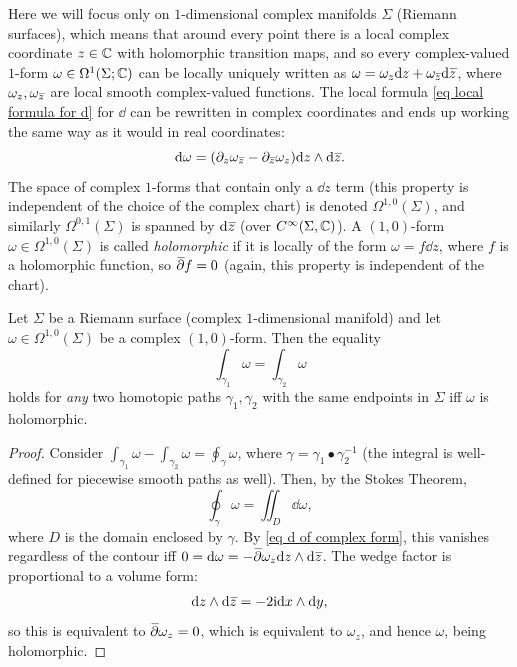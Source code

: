 \begin{rem}
    Here we will focus only on $1$-dimensional complex manifolds $\Sigma$ (Riemann surfaces), which means that around every point there is a local complex coordinate $z\in \mathbb{C}$ with holomorphic transition maps, and so every complex-valued $1$-form $\omega\in\Omega^1(\Sigma;\mathbb{C})$ can be locally uniquely written as $\omega=\omega_z \dd z+\omega_{\wb{z}} \dd \wb{z}$, where $\omega_z,\omega_{\wb{z}}$ are local smooth complex-valued functions.
    The local formula \eqref{eq local formula for d} for $\dd$ can be rewritten in complex coordinates and ends up working the same way as it would in real coordinates:
    \[\dd\omega=(\partial_{z} \omega_{\wb z}-\partial_{\wb z} \omega_{z})\dd z\wedge \dd \wb{z}.\label{eq d of complex form}\]
    The space of complex $1$-forms that contain only a $\dd z$ term (this property is independent of the choice of the complex chart) is denoted $\Omega^{1,0}(\Sigma)$, and similarly $\Omega^{0,1}(\Sigma)$ is spanned by $\dd \wb{z}$ (over $C^\infty(\Sigma,\mathbb{C})$). A $(1,0)$-form $\omega\in\Omega^{1,0}(\Sigma)$ is called \emph{holomorphic} if it is locally of the form $\omega=f\dd z$, where $f$ is a holomorphic function, so $\wb\partial f=0$ (again, this property is independent of the chart).
\end{rem}
\begin{cor}
    Let $\Sigma$ be a Riemann surface (complex $1$-dimensional manifold) and let $\omega\in\Omega^{1,0}(\Sigma)$ be a complex $(1,0)$-form. Then the equality
    \[\int_{\gamma_1}\omega=\int_{\gamma_2}\omega\]
    holds for \emph{any} two homotopic paths $\gamma_1,\gamma_2$ with the same endpoints in $\Sigma$ iff $\omega$ is holomorphic.
\end{cor}
\begin{proof}
    Consider $\int_{\gamma_1}\omega-\int_{\gamma_2}\omega=\oint_{\gamma}\omega$, where $\gamma=\gamma_1\bullet \gamma_2^{-1}$ (the integral is well-defined for piecewise smooth paths as well). Then, by the Stokes Theorem, 
    \[\oint_\gamma \omega=\iint_D \dd\omega,\]
    where $D$ is the domain enclosed by $\gamma$.
    By \eqref{eq d of complex form}, this vanishes regardless of the contour iff $0=\dd \omega=-\wb\partial\omega_z \dd z\wedge\dd\wb{z}$. The wedge factor is proportional to a volume form:
    \[\dd z\wedge\dd {\wb z}=-2\i \dd x\wedge\dd y,\]
    so this is equivalent to $\wb\partial\omega_z=0$, which is equivalent to $\omega_z$, and hence $\omega$, being holomorphic.
\end{proof}

